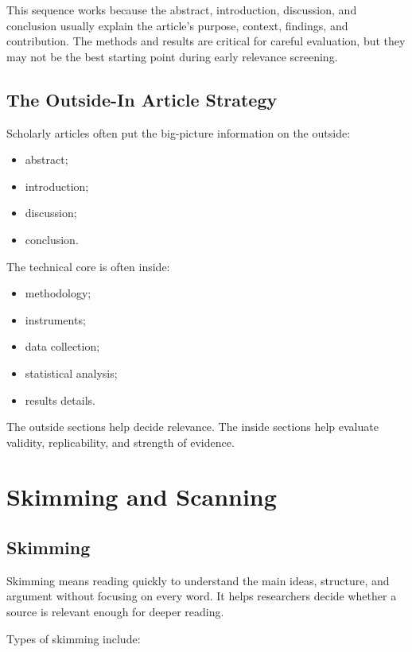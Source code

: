 \documentclass[11pt,letterpaper]{article}
\begin{document}
This sequence works because the abstract, introduction, discussion, and conclusion usually explain the article's purpose, context, findings, and contribution. The methods and results are critical for careful evaluation, but they may not be the best starting point during early relevance screening.

\subsection{The Outside-In Article Strategy}

Scholarly articles often put the big-picture information on the outside:

\begin{itemize}
  \item abstract;
  \item introduction;
  \item discussion;
  \item conclusion.
\end{itemize}

The technical core is often inside:

\begin{itemize}
  \item methodology;
  \item instruments;
  \item data collection;
  \item statistical analysis;
  \item results details.
\end{itemize}

The outside sections help decide relevance. The inside sections help evaluate validity, replicability, and strength of evidence.

\section{Skimming and Scanning}

\subsection{Skimming}

Skimming means reading quickly to understand the main ideas, structure, and argument without focusing on every word. It helps researchers decide whether a source is relevant enough for deeper reading.

Types of skimming include:
\end{document}
